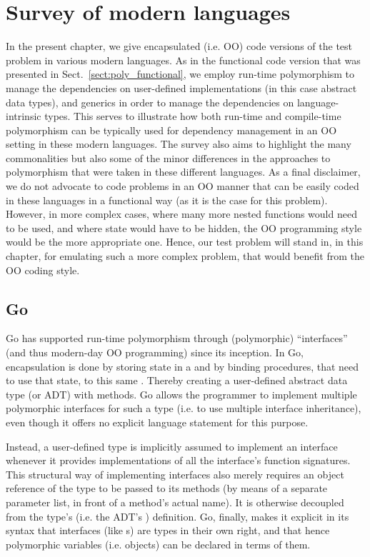 \documentclass[11pt,oneside]{report}
\newcommand{\code}[1]{{\selectfont\ttfamily{#1}}}
\begin{document}
\chapter{Survey of modern languages}
\label{chapt:survey}

In the present chapter, we give encapsulated (i.e. OO) code versions
of the test problem in various modern languages. As in the functional
code version that was presented in Sect.~\ref{sect:poly_functional},
we employ run-time polymorphism to manage the dependencies on
user-defined implementations (in this case abstract data types), and
generics in order to manage the dependencies on language-intrinsic
types. This serves to illustrate how both run-time and compile-time
polymorphism can be typically used for dependency management in an OO
setting in these modern languages. The survey also aims to highlight
the many commonalities but also some of the minor differences in the
approaches to polymorphism that were taken in these different
languages. As a final disclaimer, we do not advocate to code problems
in an OO manner that can be easily coded in these languages in a
functional way (as it is the case for this problem). However, in more
complex cases, where many more nested functions would need to be used,
and where state would have to be hidden, the OO programming style
would be the more appropriate one. Hence, our test problem will stand
in, in this chapter, for emulating such a more complex problem, that
would benefit from the OO coding style.


\section{Go}

Go has supported run-time polymorphism through (polymorphic)
``interfaces'' (and thus modern-day OO programming) since its
inception. In Go, encapsulation is done by storing state in a
\code{struct} and by binding procedures, that need to use that
state, to this same \code{struct}. Thereby creating a user-defined
abstract data type (or ADT) with methods. Go allows the programmer to
implement multiple polymorphic interfaces for such a type (i.e. to use
multiple interface inheritance), even though it offers no explicit
language statement for this purpose.

Instead, a user-defined type is implicitly assumed to implement an
interface whenever it provides implementations of all the interface's
function signatures. This structural way of implementing interfaces
also merely requires an object reference of the type to be passed to
its methods (by means of a separate parameter list, in front of a
method's actual name). It is otherwise decoupled from the type's
(i.e. the ADT's \code{struct}) definition. Go, finally, makes it
explicit in its syntax that interfaces (like \code{struct}s) are types
in their own right, and that hence polymorphic variables
(i.e. objects) can be declared in terms of them.
\end{document}

